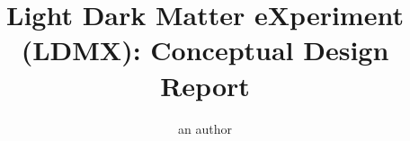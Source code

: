 \documentclass[11pt]{article}
\begin{document}

% 
%
\title{Light Dark Matter eXperiment (LDMX):  Conceptual Design Report}

\author[a]{an author}


\maketitle













%
%
\end{document}
